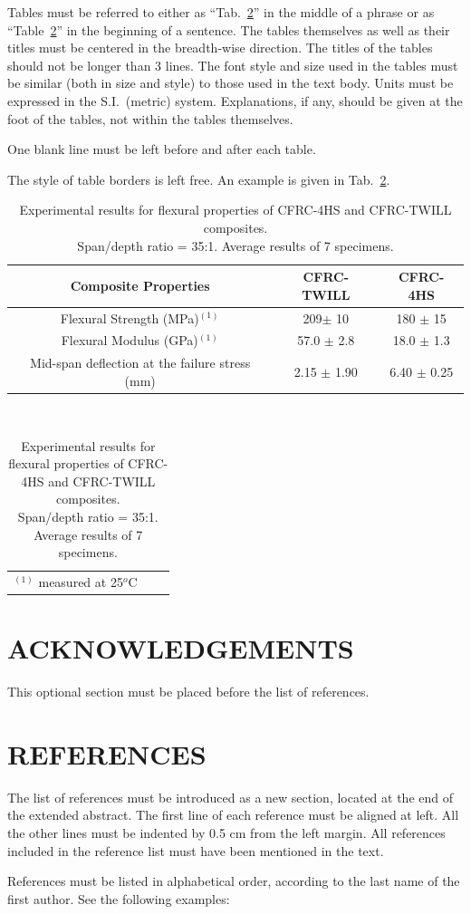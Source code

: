 \documentclass[10pt,fleqn,a4paper,twoside]{article}
\begin{document}
Tables must be referred to either as ``Tab.~\ref{tab1}'' in the middle of a phrase or as ``Table~\ref{tab1}'' in the beginning of a sentence.  The tables themselves as well as their titles must be centered in the breadth-wise direction. The titles of the tables should not be longer than 3 lines. The font style and size used in the tables must be similar (both in size and style) to those used in the text body. Units must be expressed in the S.I.\ (metric) system. Explanations, if any, should be given at the foot of the tables, not within the tables themselves.

One blank line must be left before and after each table.

The style of table borders is left free. An example is given in Tab.~\ref{tab1}.

\begin{table}[!h]
\centering
\caption{Experimental results for flexural properties of CFRC-4HS and CFRC-TWILL composites. \protect\\Span/depth ratio = 35:1. Average results of 7 specimens.}
\begin{tabular}{|c|c|c|}
\hline
Composite Properties & CFRC-TWILL & CFRC-4HS\\
\hline
Flexural Strength (MPa)$^{(1)}$ & 209$\pm$ 10 & 180 $\pm$  15\\
\hline
Flexural Modulus (GPa)$^{(1)}$ & 57.0 $\pm$ 2.8 & 18.0 $\pm$  1.3\\
\hline
Mid-span deflection at the failure stress (mm) & 2.15 $\pm$  1.90 & 6.40 $\pm$  0.25\\
\hline
\end{tabular}
\\
\begin{tabular}{p{11cm}ll}
$^{(1)}$ measured at 25$^{o}$C & &
\end{tabular}
\label{tab1}
\end{table}

\section{ACKNOWLEDGEMENTS}
This optional section must be placed before the list of references.

\section{REFERENCES}

The list of references must be introduced as a new section, located at the end of the extended abstract. The first line of each reference must be aligned at left.  All the other lines must be indented by 0.5 cm from the left margin. All references included in the reference list must have been mentioned in the text.

References must be listed in alphabetical order, according to the last name of the first author. See the following examples:


\renewcommand{\refname}{}

\end{document}
